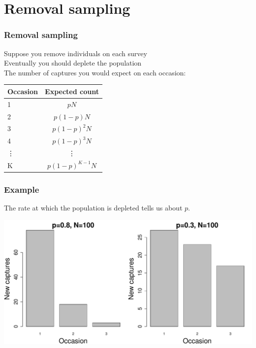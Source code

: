 \documentclass[color=usenames,dvipsnames]{beamer}\usepackage[]{graphicx}\usepackage[]{color}
\begin{document}
\section{Removal sampling}



\begin{frame}
  \frametitle{Removal sampling}
  \large
  { Suppose you remove individuals on each survey \\}
  \vfill
  \pause
  { Eventually you should deplete the population \\}
  \vfill
  \pause
  { The number of captures you would expect on each occasion:}
  \begin{center}
    \begin{tabular}{lc}
      \hline
      Occasion & Expected count \\
      \hline
      1 & $pN$ \\
      2 & $p(1-p)N$ \\
      3 & $p(1-p)^2N$ \\
      4 & $p(1-p)^3N$ \\
      \vdots & \vdots \\
      K & $p(1-p)^{K-1}N$ \\
      \hline
    \end{tabular}
  \end{center}
\end{frame}





\begin{frame}[fragile]
  \frametitle{Example}
  \begin{center}
    The rate at which the population is depleted tells us about $p$. \\
    \vfill


\includegraphics[width=\textwidth]{mark-recap-closedpop-rem}
 \end{center}
\end{frame}
\end{document}
